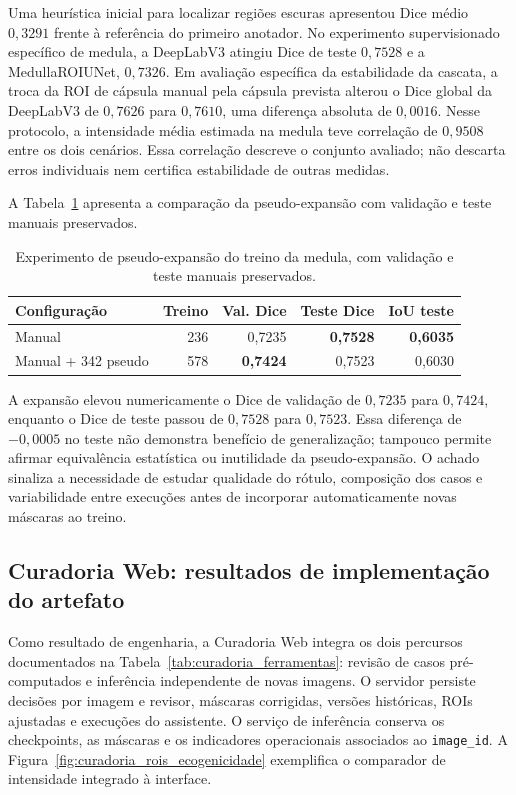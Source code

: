 \documentclass[12pt]{article}
\begin{document}
Uma heurística inicial para localizar regiões escuras apresentou Dice médio $0{,}3291$ frente à referência do primeiro anotador. No experimento supervisionado específico de medula, a DeepLabV3 atingiu Dice de teste $0{,}7528$ e a MedullaROIUNet, $0{,}7326$. Em avaliação específica da estabilidade da cascata, a troca da ROI de cápsula manual pela cápsula prevista alterou o Dice global da DeepLabV3 de $0{,}7626$ para $0{,}7610$, uma diferença absoluta de $0{,}0016$. Nesse protocolo, a intensidade média estimada na medula teve correlação de $0{,}9508$ entre os dois cenários. Essa correlação descreve o conjunto avaliado; não descarta erros individuais nem certifica estabilidade de outras medidas.

A Tabela~\ref{tab:medulla_expand} apresenta a comparação da pseudo-expansão com validação e teste manuais preservados.

\begin{table}[!htbp]
\centering
\caption[Pseudo-expansão do conjunto de medula]{Experimento de pseudo-expansão do treino da medula, com validação e teste manuais preservados.}
\label{tab:medulla_expand}
\begin{tabular}{lrrrr}
\toprule
\textbf{Configuração} & \textbf{Treino} & \textbf{Val. Dice} & \textbf{Teste Dice} & \textbf{IoU teste} \\
\midrule
Manual & 236 & 0,7235 & \textbf{0,7528} & \textbf{0,6035} \\
Manual + 342 pseudo & 578 & \textbf{0,7424} & 0,7523 & 0,6030 \\
\bottomrule
\end{tabular}
\end{table}

A expansão elevou numericamente o Dice de validação de $0{,}7235$ para $0{,}7424$, enquanto o Dice de teste passou de $0{,}7528$ para $0{,}7523$. Essa diferença de $-0{,}0005$ no teste não demonstra benefício de generalização; tampouco permite afirmar equivalência estatística ou inutilidade da pseudo-expansão. O achado sinaliza a necessidade de estudar qualidade do rótulo, composição dos casos e variabilidade entre execuções antes de incorporar automaticamente novas máscaras ao treino.


\subsection{Curadoria Web: resultados de implementação do artefato}

Como resultado de engenharia, a Curadoria Web integra os dois percursos documentados na Tabela~\ref{tab:curadoria_ferramentas}: revisão de casos pré-computados e inferência independente de novas imagens. O servidor persiste decisões por imagem e revisor, máscaras corrigidas, versões históricas, ROIs ajustadas e execuções do assistente. O serviço de inferência conserva os checkpoints, as máscaras e os indicadores operacionais associados ao \texttt{image\_id}. A Figura~\ref{fig:curadoria_rois_ecogenicidade} exemplifica o comparador de intensidade integrado à interface.
\end{document}
